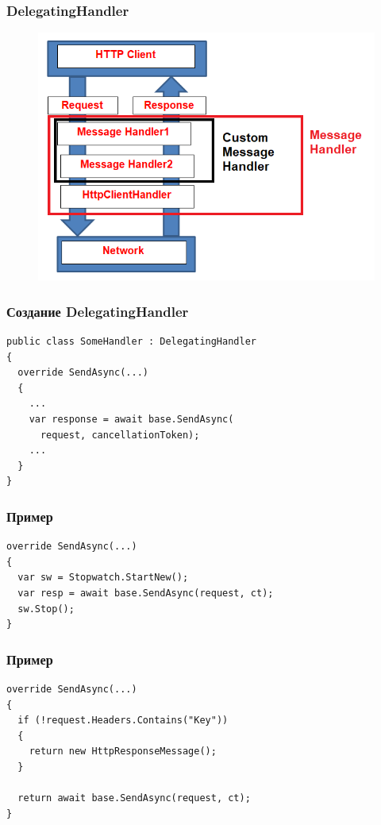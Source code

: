 \documentclass[17pt,aspectratio=169]{beamer}
\begin{document}
\begin{frame}[fragile]
\frametitle{DelegatingHandler}
\begin{figure}
\includegraphics[scale=0.65]{handlers}
\end{figure}
\end{frame}

\begin{frame}[fragile]
\frametitle{Создание DelegatingHandler}
\begin{lstlisting}
public class SomeHandler : DelegatingHandler
{
  override SendAsync(...)
  {
    ...
    var response = await base.SendAsync(
      request, cancellationToken);
    ...
  }
}     
\end{lstlisting}
\end{frame}

\begin{frame}[fragile]
\frametitle{Пример}
\begin{lstlisting}
override SendAsync(...)
{
  var sw = Stopwatch.StartNew();
  var resp = await base.SendAsync(request, ct);
  sw.Stop();
}     
\end{lstlisting}
\end{frame}

\begin{frame}[fragile]
\frametitle{Пример}
\begin{lstlisting}
override SendAsync(...)
{
  if (!request.Headers.Contains("Key"))
  {
    return new HttpResponseMessage();
  }
  
  return await base.SendAsync(request, ct);
}     
\end{lstlisting}
\end{frame}
\end{document}
